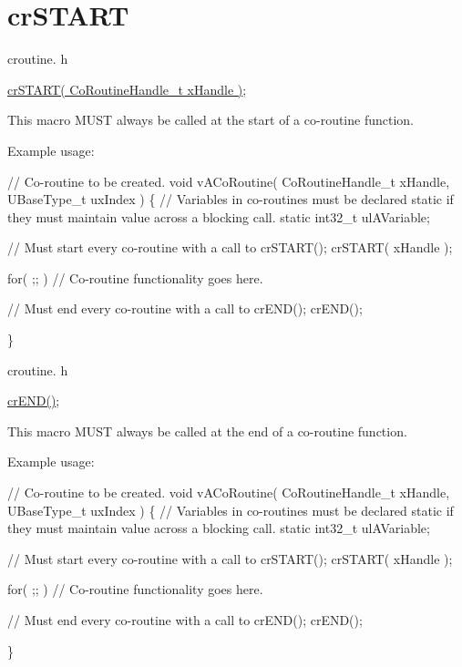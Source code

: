 \hypertarget{group__crSTART}{}\section{cr\+S\+T\+A\+RT}
\label{group__crSTART}
croutine. h 
\begin{DoxyPre}
\hyperlink{croutine_8h_a19a57a201a325e8af1207ed68c4aedde}{crSTART( CoRoutineHandle\_t xHandle )};\end{DoxyPre}


This macro M\+U\+ST always be called at the start of a co-\/routine function.

Example usage\+: 
\begin{DoxyPre}
// Co-routine to be created.
void vACoRoutine( CoRoutineHandle\_t xHandle, UBaseType\_t uxIndex )
\{
// Variables in co-routines must be declared static if they must maintain value across a blocking call.
static int32\_t ulAVariable;
\begin{DoxyVerb}// Must start every co-routine with a call to crSTART();
crSTART( xHandle );

for( ;; )
{
     // Co-routine functionality goes here.
}

// Must end every co-routine with a call to crEND();
crEND();
\end{DoxyVerb}

\}\end{DoxyPre}


croutine. h 
\begin{DoxyPre}
\hyperlink{croutine_8h_ae6038cc976689b50000475ebfc4e2f23}{crEND()};\end{DoxyPre}


This macro M\+U\+ST always be called at the end of a co-\/routine function.

Example usage\+: 
\begin{DoxyPre}
// Co-routine to be created.
void vACoRoutine( CoRoutineHandle\_t xHandle, UBaseType\_t uxIndex )
\{
// Variables in co-routines must be declared static if they must maintain value across a blocking call.
static int32\_t ulAVariable;
\begin{DoxyVerb}// Must start every co-routine with a call to crSTART();
crSTART( xHandle );

for( ;; )
{
     // Co-routine functionality goes here.
}

// Must end every co-routine with a call to crEND();
crEND();
\end{DoxyVerb}

\}\end{DoxyPre}
 